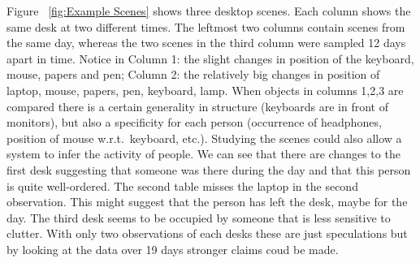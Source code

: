 \documentclass[letterpaper, 10 pt, conference]{ieeeconf}  %
\begin{document}
Figure ~\ref{fig:Example Scenes} shows three desktop scenes. Each column shows the same desk at two different times. The leftmost two columns 
contain scenes from the same day, whereas the two scenes in the third column were sampled 12 days apart in time. Notice in Column 1: the slight changes in 
position of the keyboard, mouse, papers and pen; Column 2: the relatively big changes in position of laptop, mouse, papers, pen, keyboard, 
lamp. When objects in columns 1,2,3 are compared there is a certain generality in structure (keyboards are in front of monitors), but 
also a specificity for each person (occurrence of headphones, position of mouse w.r.t.\ keyboard, etc.). Studying the scenes could also allow a system to 
infer the activity of people. We can see that there are changes to the first desk suggesting that someone 
was there during the day and that this person is quite well-ordered. The second table misses the laptop in the second observation. This might suggest that 
the person has left the desk, maybe for the day. The third desk seems to be occupied by someone that is less sensitive to 
clutter. With only two observations of each desks these are just speculations but by looking at the data over 19 days stronger claims coud be made.
\end{document}
